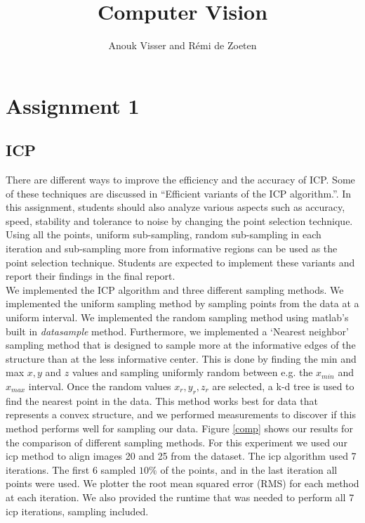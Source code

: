 \documentclass[12pt]{amsart}
\title{Computer Vision}
\author{Anouk Visser and R\'emi de Zoeten}
\date{} %
\begin{document}
\maketitle

\section{Assignment 1}
\subsection{ICP}
\cite{anouk}
There are different ways to improve the efficiency and the accuracy of ICP. Some of these techniques are discussed in ``Efficient variants of the ICP algorithm.''. In this assignment, students should also analyze various aspects such as accuracy, speed, stability and tolerance to noise by changing the point selection technique. Using all the points, uniform sub-sampling, random sub-sampling in each iteration and sub-sampling more from informative regions can be used as the point selection technique. Students are expected to implement these variants and report their findings in the final report.\\

We implemented the ICP algorithm and three different sampling methods. We implemented the uniform sampling method by sampling points from the data at a uniform interval. We implemented the random sampling method using matlab's built in \textit{datasample} method. Furthermore, we implemented a `Nearest neighbor' sampling method that is designed to sample more at the informative edges of the structure than at the less informative center. This is done by finding the min and max $x, y$ and $z$ values and sampling uniformly random between e.g. the $x_{min}$ and $x_{max}$ interval. Once the random values $x_r, y_r, z_r$ are selected, a k-d tree is used to find the nearest point in the data. This method works best for data that represents a convex structure, and we performed measurements to discover if this method performs well for sampling our data.
Figure \ref{comp} shows our results for the comparison of different sampling methods. For this experiment we used our icp method to align images 20 and 25 from the dataset. The icp algorithm used 7 iterations. The first 6 sampled $10\%$ of the points, and in the last iteration all points were used. We plotter the root mean squared error (RMS) for each method at each iteration. We also provided the runtime that was needed to perform all 7 icp iterations, sampling included.
\end{document}
